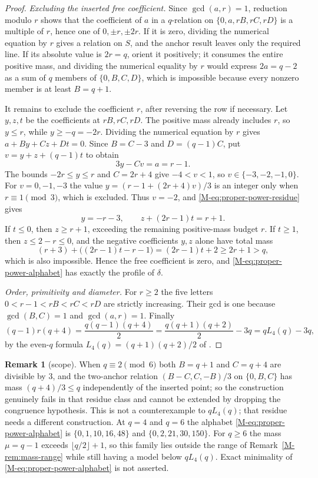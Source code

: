 \documentclass[11pt,reqno]{amsart}
\theoremstyle{plain}
\theoremstyle{definition}
\newtheorem{remark}[theorem]{Remark}
\theoremstyle{plain}
\theoremstyle{plain}
\theoremstyle{plain}
\theoremstyle{plain}
\theoremstyle{plain}
\theoremstyle{plain}
\theoremstyle{definition}
\theoremstyle{definition}
\theoremstyle{definition}
\theoremstyle{plain}
\begin{document}
\begin{proof}
\smallskip\noindent\emph{Excluding the inserted free coefficient.}
Since $\gcd(a,r)=1$, reduction modulo $r$ shows that the coefficient of
$a$ in a $q$-relation on $\{0,a,rB,rC,rD\}$ is a multiple of $r$, hence
one of $0,\pm r,\pm2r$. If it is zero, dividing the numerical equation by
$r$ gives a relation on $S$, and the anchor result leaves only the
required line. If its absolute value is $2r=q$, orient it positively; it
consumes the entire positive mass, and dividing the numerical equality by
$r$ would express $2a=q-2$ as a sum of $q$ members of $\{0,B,C,D\}$, which
is impossible because every nonzero member is at least $B=q+1$.

It remains to exclude the coefficient $r$, after reversing the row if
necessary. Let $y,z,t$ be the coefficients at $rB,rC,rD$. The positive
mass already includes $r$, so $y\le r$, while $y\ge-q=-2r$. Dividing the
numerical equation by $r$ gives $a+By+Cz+Dt=0$. Since $B=C-3$ and
$D=(q-1)C$, put $v=y+z+(q-1)t$ to obtain
\begin{equation}\label{M-eq:proper-power-residue}
 3y-Cv=a=r-1 .
\end{equation}
The bounds $-2r\le y\le r$ and $C=2r+4$ give $-4<v<1$, so
$v\in\{-3,-2,-1,0\}$. For $v=0,-1,-3$ the value
$y=(r-1+(2r+4)v)/3$ is an integer only when $r\equiv1\pmod3$, which is
excluded. Thus $v=-2$, and \eqref{M-eq:proper-power-residue} gives
\begin{equation}\label{M-eq:proper-power-v}
 y=-r-3,\qquad z+(2r-1)t=r+1 .
\end{equation}
If $t\le0$, then $z\ge r+1$, exceeding the remaining positive-mass budget
$r$. If $t\ge1$, then $z\le2-r\le0$, and the negative coefficients $y,z$
alone have total mass
\[
 (r+3)+\bigl((2r-1)t-r-1\bigr)=(2r-1)t+2\ge2r+1>q ,
\]
which is also impossible. Hence the free coefficient is zero, and
\eqref{M-eq:proper-power-alphabet} has exactly the profile of $\delta$.

\smallskip\noindent\emph{Order, primitivity and diameter.}
For $r\ge2$ the five letters $0<r-1<rB<rC<rD$ are strictly increasing.
Their gcd is one because $\gcd(B,C)=1$ and $\gcd(a,r)=1$. Finally
\[
 (q-1)r(q+4)=\frac{q(q-1)(q+4)}2=\frac{q(q+1)(q+2)}2-3q=qL_4(q)-3q,
\]
by the even-$q$ formula $L_4(q)=(q+1)(q+2)/2$ of
\cite[Theorem~10.3]{M-Shin26}.
\end{proof}

\begin{remark}[scope]\label{M-rem:proper-power-scope}
When $q\equiv2\pmod6$ both $B=q+1$ and $C=q+4$ are divisible by $3$, and
the two-anchor relation $(B-C,C,-B)/3$ on $\{0,B,C\}$ has mass
$(q+4)/3\le q$ independently of the inserted point; so the construction
genuinely fails in that residue class and cannot be extended by dropping
the congruence hypothesis. This is not a counterexample to $qL_4(q)$; that
residue needs a different construction. At $q=4$ and $q=6$ the alphabet
\eqref{M-eq:proper-power-alphabet} is $\{0,1,10,16,48\}$ and
$\{0,2,21,30,150\}$. For $q\ge6$ the mass $\mu=q-1$ exceeds
$\lfloor q/2\rfloor+1$, so this family lies outside the range of
Remark~\ref{M-rem:mass-range} while still having a model below $qL_4(q)$.
Exact minimality of \eqref{M-eq:proper-power-alphabet} is not asserted.
\end{remark}
\end{document}
